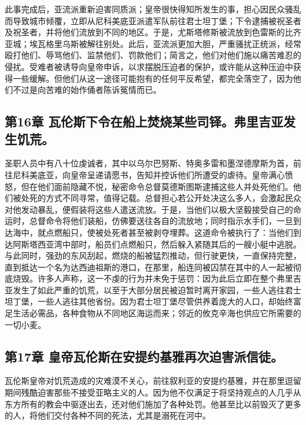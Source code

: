 此事完成后，亚流派重新迫害同质派；皇帝很快得知所发生的事，担心因民众骚乱而导致城市倾覆，立即从尼科美底亚派遣军队前往君士坦丁堡；下令逮捕被祝圣者及祝圣者，并将他们流放到不同的地区。于是，尤斯塔修斯被流放到色雷斯的比齐亚城；埃瓦格里乌斯被解往别处。此后，亚流派更加大胆，严重骚扰正统派，经常殴打他们、辱骂他们、监禁他们、罚款他们；简言之，他们对他们施以痛苦难忍的侵扰。受难者被诱导向皇帝申诉，以求摆脱压迫者的保护，或许能从这种压迫中获得一些缓解。但他们从这一途径可能抱有的任何平反希望，都完全落空了，因为他们不过是向苦难的始作俑者陈诉冤情而已。\par


\subsection{第16章 瓦伦斯下令在船上焚烧某些司铎。弗里吉亚发生饥荒。}

圣职人员中有八十位虔诚者，其中以乌尔巴努斯、特奥多雷和墨涅德摩斯为首，前往尼科美底亚，向皇帝呈递请愿书，告知并控诉他们所遭受的虐待。皇帝满心愤怒，但在他们面前隐藏不悦，秘密命令总督莫德斯图斯逮捕这些人并处死他们。他们被处死的方式不同寻常，值得记载。总督担心若公开处决这么多人，会激起民众对他发动暴乱，便假装将这些人遣送流放。于是，当他们以极大坚毅接受自己的命运时，总督命令将他们装船，仿佛要送往各自的流放地；同时指示水手们，一旦到达海中，就点燃船只，使被处死者甚至被剥夺埋葬。这道命令被执行了：当他们到达阿斯塔西亚湾中部时，船员们点燃船只，然后躲入紧随其后的一艘小艇中逃脱。与此同时，强劲的东风刮起，燃烧的船被猛烈推动，但行驶更快，一直保持完整，直到抵达一个名为达西迪祖斯的港口，在那里，船连同被囚禁在其中的人一起被彻底烧毁。许多人声称，这一不虔的行为并未免于惩罚：因为此后立即在整个弗里吉亚发生了如此严重的饥荒，以至于大部分居民被迫暂时离开家园，一些人逃往君士坦丁堡，一些人逃往其他省份。因为君士坦丁堡尽管供养着庞大的人口，却始终富足生活必需品，各种食物从不同地区海运而来；邻近的攸克辛海也供应它所需要的一切小麦。\par


\subsection{第17章 皇帝瓦伦斯在安提约基雅再次迫害派信徒。}

瓦伦斯皇帝对饥荒造成的灾难漠不关心，前往叙利亚的安提约基雅，并在那里逗留期间残酷迫害那些不接受亚略主义的人。因为他不仅满足于将坚持观点的人几乎从东方所有的教会中驱逐出去，还对他们施加了各种处罚。他甚至比以前毁灭了更多的人，将他们交付各种不同的死法，尤其是溺死在河中。\par


